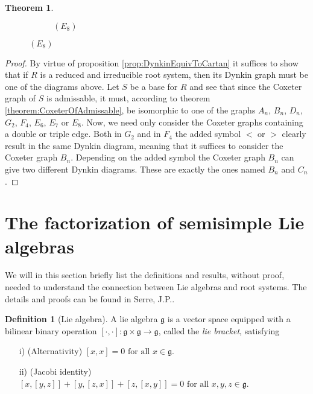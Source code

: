 \documentclass[twoside,utf8]{article}
\theoremstyle{plain}
\newtheorem{theorem}{Theorem}
\theoremstyle{definition}
\newtheorem{definition}{Definition}
\theoremstyle{remark}
\begin{document}
\begin{theorem}
\begin{figure}[H]
\begin{subfigure}[b]{0.5\textwidth} 
\centering
{}
\caption*{$(E_8)$} \label{fig:E8_dyn}
\end{subfigure}
\end{figure}
\end{theorem}
\begin{proof}
By virtue of proposition \ref*{prop:DynkinEquivToCartan} it suffices to show that if $R$ is a reduced and irreducible root system, then its Dynkin graph must be one of the diagrams above. Let $S$ be a base for $R$ and see that since the Coxeter graph of $S$ is admissable, it must, according to theorem \ref*{theorem:CoxeterOfAdmissable}, be isomorphic to one of the graphs $A_n$, $B_n$, $D_n$, $G_2$, $F_4$, $E_6$, $E_7$ or $E_8$. Now, we need only consider the Coxeter graphs containing a double or triple edge. Both in $G_2$ and in $F_4$ the added symbol $<$ or $>$ clearly result in the same Dynkin diagram, meaning that it suffices to consider the Coxeter graph $B_n$. Depending on the added symbol the Coxeter graph $B_n$ can give two different Dynkin diagrams. These are exactly the ones named $B_n$ and $C_n$.
\end{proof}



\section{The factorization of semisimple Lie algebras}
We will in this section briefly list the definitions and results, without proof, needed to understand the connection between Lie algebras and root systems. The details and proofs can be found in Serre, J.P.\cite{Serre}. 

\begin{definition}[Lie algebra]
A lie algebra $\mathfrak{g}$ is a vector space equipped with a bilinear binary operation $[\cdot,\cdot]:\mathfrak{g}\times \mathfrak{g} \rightarrow \mathfrak{g}$, called the \textit{lie bracket}, satisfying
\begin{itemize}
\item[i)](Alternativity) $[x,x]=0 \mbox{ for all } x \in \mathfrak{g}$.
\item[ii)](Jacobi identity) $[x,[y,z]]+[y,[z,x]]+[z,[x,y]]=0 \mbox{ for all } x,y,z \in \mathfrak{g}$.
\end{itemize}
\end{definition}
\end{document}

